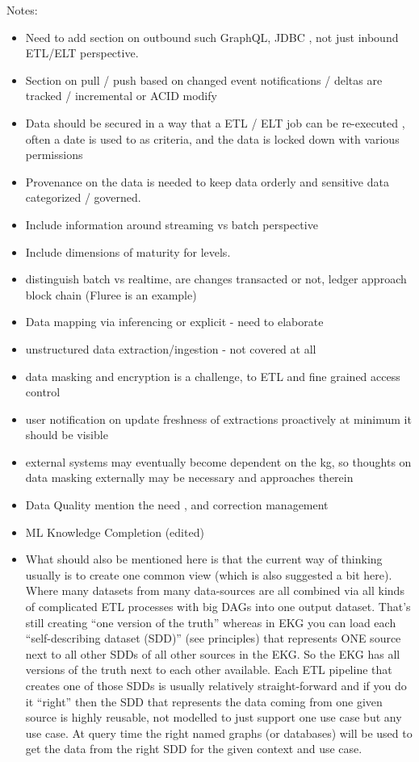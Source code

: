 {Notes:
\begin{itemize}
\item Need to add section on outbound such GraphQL, JDBC , not just inbound ETL/ELT perspective.
\item Section on pull / push based on changed event notifications / deltas are tracked / incremental or ACID modify
\item Data should be secured in a way that a ETL / ELT job can be re-executed ,
      often a date is used to as criteria, and the data is locked down with various permissions
\item Provenance on the data is needed to keep data orderly and sensitive data categorized / governed.
\item Include information around streaming vs batch perspective
\item Include dimensions of maturity for levels.
\item distinguish batch vs realtime, are changes transacted or not, ledger approach block chain (Fluree is an example)
\item Data mapping via inferencing or explicit - need to elaborate
\item unstructured data extraction/ingestion - not covered at all
\item data masking and encryption is a challenge, to ETL and fine grained access control
\item user notification on update freshness of extractions proactively at minimum it should be visible
\item external systems may eventually become dependent on the kg, so thoughts on data masking externally may be necessary and approaches therein
\item Data Quality mention the need , and correction management
\item ML Knowledge Completion (edited)
\item What should also be mentioned here is that the current way of thinking usually is to create one common view
      (which is also suggested a bit here).
      Where many datasets from many data-sources are all combined via all kinds of complicated ETL processes
      with big DAGs into one output dataset. That’s still creating “one version of the truth” whereas in EKG
      you can load each “self-describing dataset (SDD)” (see principles) that represents ONE source next
      to all other SDDs of all other sources in the EKG. So the EKG has all versions of the truth next to
      each other available. Each ETL pipeline that creates one of those SDDs is usually relatively
      straight-forward and if you do it “right” then the SDD that represents the data coming from one
      given source is highly reusable, not modelled to just support one use case but any use case.
      At query time the right named graphs (or databases) will be used to get the data from the
      right SDD for the given context and use case.
\end{itemize}
}